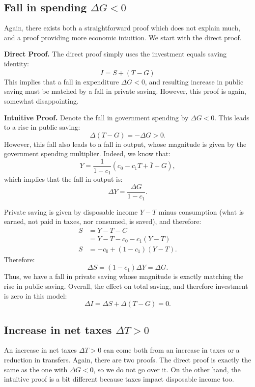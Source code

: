 \documentclass[]{book}
\theoremstyle{definition}
\theoremstyle{definition}
\theoremstyle{definition}
\theoremstyle{remark}
\begin{document}
\subsection{\texorpdfstring{Fall in spending
\(\Delta G<0\)}{Fall in spending \textbackslash{}Delta G\textless{}0}}\label{fall-in-spending-delta-g0}

Again, there exists both a straightforward proof which does not explain
much, and a proof providing more economic intuition. We start with the
direct proof.

\textbf{Direct Proof.} The direct proof simply uses the investment
equals saving identity: \[\bar{I} = S + (T-G)\] This implies that a fall
in expenditure \(\Delta G<0\), and resulting increase in public saving
must be matched by a fall in private saving. However, this proof is
again, somewhat disappointing.

\textbf{Intuitive Proof.} Denote the fall in government spending by
\(\Delta G<0\). This leads to a rise in public saving:
\[\Delta(T-G)=-\Delta G>0.\] However, this fall also leads to a fall in
output, whose magnitude is given by the government spending multiplier.
Indeed, we know that:
\[Y=\frac{1}{1-c_{1}}\left(c_{0}-c_{1}T+\bar{I}+G\right),\] which
implies that the fall in output is:
\[\Delta Y=\frac{\Delta G}{1-c_{1}}.\]

Private saving is given by disposable income \(Y-T\) minus consumption
(what is earned, not paid in taxes, nor consumed, is saved), and
therefore: \[
\begin{aligned}
S   &= Y-T-C\\
&= Y-T-c_{0}-c_{1}\left(Y-T\right)\\
S   &=-c_{0}+\left(1-c_{1}\right)\left(Y-T\right).
\end{aligned}
\] Therefore: \[\Delta S=(1-c_{1})\Delta Y=\Delta G.\] Thus, we have a
fall in private saving whose magnitude is exactly matching the rise in
public saving. Overall, the effect on total saving, and therefore
investment is zero in this model: \[\Delta I  =\Delta S+\Delta(T-G)=0.\]

\subsection{\texorpdfstring{Increase in net taxes
\(\Delta T>0\)}{Increase in net taxes \textbackslash{}Delta T\textgreater{}0}}\label{increase-in-net-taxes-delta-t0}

An increase in net taxes \(\Delta T>0\) can come both from an increase
in taxes or a reduction in transfers. Again, there are two proofs. The
direct proof is exactly the same as the one with \(\Delta G<0\), so we
do not go over it. On the other hand, the intuitive proof is a bit
different because taxes impact disposable income too.
\end{document}
